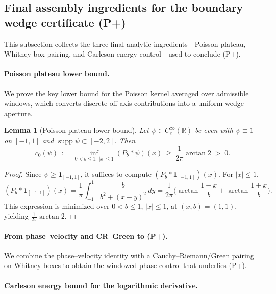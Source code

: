 \documentclass[11pt]{amsart}
\newtheorem{lemma}[theorem]{Lemma}
\theoremstyle{definition}
\theoremstyle{remark}
\newcommand{\R}{\mathbb{R}}
\begin{document}
\subsection{Final assembly ingredients for the boundary wedge certificate (P+)}

This subsection collects the three final analytic ingredients—Poisson plateau, Whitney box pairing, and Carleson-energy control—used to conclude (P+).

\paragraph{Poisson plateau lower bound.}

We prove the key lower bound for the Poisson kernel averaged over admissible windows, which converts discrete off-axis contributions into a uniform wedge aperture.
\begin{lemma}[Poisson plateau lower bound]\label{lem:poisson-plateau}
Let \(\psi\in C_c^\infty(\R)\) be even with \(\psi\equiv 1\) on \([-1,1]\) and \(\operatorname{supp}\psi\subset[-2,2]\).
Then
\[
  c_0(\psi)\ :=\ \inf_{0<b\le 1,\ |x|\le 1} (P_b*\psi)(x)\ \ge\ \frac{1}{2\pi}\arctan 2\;>\;0.
\]
\end{lemma}
\begin{proof}
Since \(\psi\ge \mathbf 1_{[-1,1]}\), it suffices to compute \((P_b*\mathbf 1_{[-1,1]})(x)\).
For \(|x|\le 1\),
\[
 (P_b*\mathbf 1_{[-1,1]})(x)
 =\frac{1}{\pi}\int_{-1}^{1}\frac{b}{b^2+(x-y)^2}\,dy
 =\frac{1}{2\pi}\Big(\arctan\frac{1-x}{b}+\arctan\frac{1+x}{b}\Big).
\]
This expression is minimized over \(0<b\le 1\), \(|x|\le 1\), at \((x,b)=(1,1)\), yielding \(\frac{1}{2\pi}\arctan 2\).
\end{proof}

\paragraph{From phase--velocity and CR--Green to (P+).}

\label{app:assemble-pplus}

We combine the phase--velocity identity with a Cauchy--Riemann/Green pairing on Whitney boxes to obtain the windowed phase control that underlies (P+).

\paragraph{Carleson energy bound for the logarithmic derivative.}

\label{appA:carleson}
\end{document}
